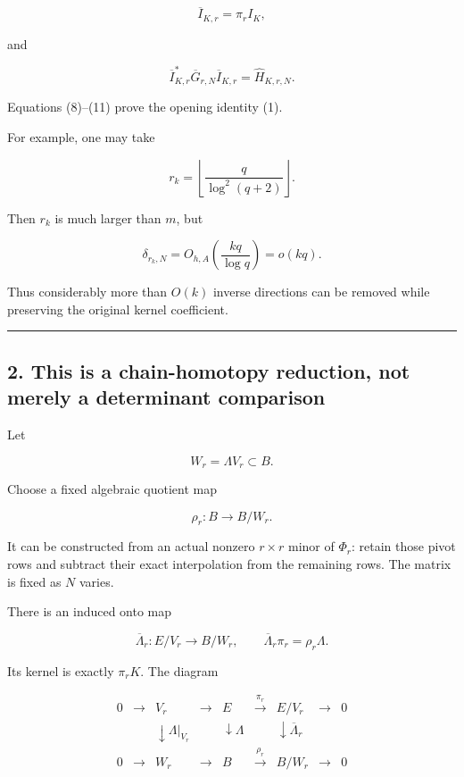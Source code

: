 \documentclass[11pt]{article}
\begin{document}
\[
\overline I_{K,r}=\pi_rI_K,
\]

and

\[
\overline I_{K,r}^*\overline G_{r,N}\overline I_{K,r}
=
\widehat H_{K,r,N}.
\]

Equations (8)--(11) prove the opening identity (1).

For example, one may take

\[
r_k=\left\lfloor\frac{q}{\log^2(q+2)}\right\rfloor.
\]

Then \(r_k\) is much larger than \(m\), but

\[
\delta_{r_k,N}
=
O_{h,A}\!\left(\frac{kq}{\log q}\right)
=o(kq).
\]

Thus considerably more than \(O(k)\) inverse directions can be removed while preserving the original kernel coefficient.

\begin{center}\rule{0.5\linewidth}{0.5pt}\end{center}

\subsection{2. This is a chain-homotopy reduction, not merely a determinant comparison}\label{this-is-a-chain-homotopy-reduction-not-merely-a-determinant-comparison}

Let

\[
W_r=\Lambda V_r\subset B.
\]

Choose a fixed algebraic quotient map

\[
\rho_r:B\longrightarrow B/W_r.
\]

It can be constructed from an actual nonzero \(r\times r\) minor of \(\Phi_r\): retain those pivot rows and subtract their exact interpolation from the remaining rows. The matrix is fixed as \(N\) varies.

There is an induced onto map

\[
\overline\Lambda_r:E/V_r\longrightarrow B/W_r,
\qquad
\overline\Lambda_r\pi_r=\rho_r\Lambda.
\tag{12}
\]

Its kernel is exactly \(\pi_rK\). The diagram

\[
\begin{array}{ccccccccc}
0&\to&V_r&\to&E&\xrightarrow{\pi_r}&E/V_r&\to&0\\
&&\downarrow{\Lambda|_{V_r}}&&\downarrow\Lambda&&
\downarrow\overline\Lambda_r\\
0&\to&W_r&\to&B&\xrightarrow{\rho_r}&B/W_r&\to&0
\end{array}
\tag{13}
\]
\end{document}

